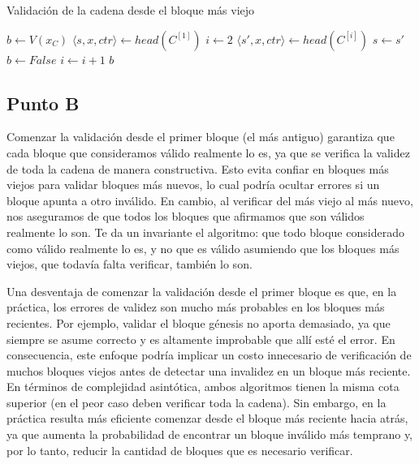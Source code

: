 \documentclass[12pt]{article}
\begin{document}
\begin{algorithm}[H]
\caption{Validación de la cadena desde el bloque más viejo}
\begin{algorithmic}[1]
    \State $b \gets V(x_C)$ 
        \State $\langle s, x, ctr \rangle \gets head(C^{[1]})$ 
         
            \State $i \gets 2$ 
            \Repeat {}
                \State $\langle s', x, ctr \rangle \gets head(C^{[i]})$ 
                 
                    \State $s \gets s'$ 
                \Else
                    \State $b \gets False$
                \EndIf
                \State $i \gets i + 1$
        \EndIf
    \EndIf
    \State \Return $b$
\EndFunction
\end{algorithmic}
\end{algorithm}

\subsection*{Punto B}

Comenzar la validación desde el primer bloque (el más antiguo) garantiza que cada bloque que consideramos válido realmente lo es, ya que se verifica la validez de toda la cadena de manera constructiva. Esto evita confiar en bloques más viejos para validar bloques más nuevos, lo cual podría ocultar errores si un bloque apunta a otro inválido. En cambio, al verificar del más viejo al más nuevo, nos aseguramos de que todos los bloques que afirmamos que son válidos realmente lo son.
Te da un invariante el algoritmo: que todo bloque considerado como válido realmente lo es, y no que es válido asumiendo que los bloques más viejos, que todavía falta verificar, también lo son.

Una desventaja de comenzar la validación desde el primer bloque es que, en la práctica, los errores de validez son mucho más probables en los bloques más recientes. Por ejemplo, validar el bloque génesis no aporta demasiado, ya que siempre se asume correcto y es altamente improbable que allí esté el error. En consecuencia, este enfoque podría implicar un costo innecesario de verificación de muchos bloques viejos antes de detectar una invalidez en un bloque más reciente. En términos de complejidad asintótica, ambos algoritmos tienen la misma cota superior (en el peor caso deben verificar toda la cadena). Sin embargo, en la práctica resulta más eficiente comenzar desde el bloque más reciente hacia atrás, ya que aumenta la probabilidad de encontrar un bloque inválido más temprano y, por lo tanto, reducir la cantidad de bloques que es necesario verificar.
\end{document}
